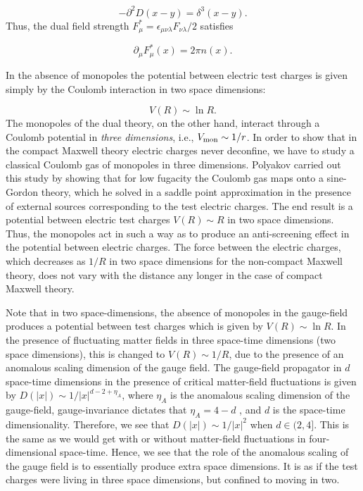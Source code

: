 \documentclass[a4paper,showpacs,preprintnumbers,amsmath,amssymb,prl,twocolumn]{revtex4}
\begin{document}
\begin{equation}
-\partial^2 D(x-y)=\delta^3(x-y).
\end{equation}
Thus, the dual field strength 
$F^*_\mu=\epsilon_{\mu\nu\lambda}F_{\nu\lambda}/2$ satisfies 

\begin{equation}
\partial_\mu F^*_\mu(x)=2\pi n(x).
\end{equation}

In the absence of monopoles the potential between electric test 
charges is given simply by the Coulomb interaction in two 
space dimensions:

\begin{equation}
\label{pot1}
V(R)\sim\ln R. 
\end{equation}
The monopoles of the dual theory, on the other hand, interact through a 
Coulomb potential in {\it three dimensions}, i.e., $V_{\rm mon}\sim 1/r$. 
In order to show that in the compact Maxwell theory electric charges 
never deconfine, we have to study a classical Coulomb gas of 
monopoles in three dimensions. Polyakov \cite{Polyakov} carried out 
this study by showing that for low fugacity the Coulomb gas maps 
onto a sine-Gordon theory, which he solved in a saddle point 
approximation in the presence of external sources corresponding 
to the test electric charges. The end result is a potential 
between electric test charges $V(R) \sim R$ in two space dimensions. 
Thus, the monopoles act in such a way as to produce an anti-screening 
effect in the potential between electric charges. The force between 
the electric charges, which decreases as $1/R$ in two space dimensions 
for the non-compact Maxwell theory, does not vary with the distance 
any longer in the case of compact Maxwell theory. 

Note that in two space-dimensions, the absence of monopoles in the 
gauge-field produces a potential between test charges which is given 
by $V(R) \sim \ln R$.  In the presence of fluctuating matter fields 
in three space-time dimensions (two space dimensions), this  is 
changed to $V(R) \sim 1/R$, due to the presence of an anomalous 
scaling dimension of the gauge field. The gauge-field propagator in 
$d$ space-time dimensions in the presence of critical matter-field 
fluctuations is given by $D(|x|) \sim 1/|x|^{d-2+\eta_A}$, where 
$\eta_A$ is the anomalous scaling dimension of the gauge-field,
gauge-invariance dictates that $\eta_A=4-d$ \cite{Herbut}, and 
$d$ is the space-time dimensionality. Therefore, we see that 
$D(|x|) \sim 1/|x|^2$ when $d \in (2,4]$. This is the same as we would 
get with or without matter-field fluctuations in four-dimensional 
space-time. 
Hence, we see that the role of the anomalous scaling of the gauge 
field is to essentially produce extra space dimensions. It is as if the  
test charges were living in three space dimensions, but confined to 
moving in two.
 
\end{document}
